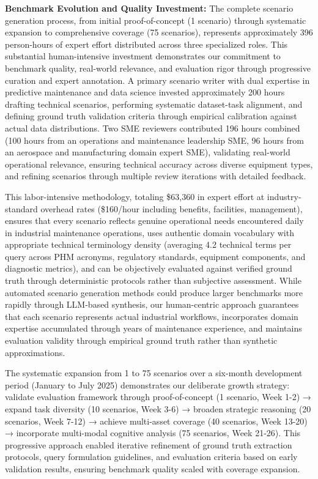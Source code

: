 \documentclass[sigconf,review]{acmart}
\begin{document}
\textbf{Benchmark Evolution and Quality Investment:} The complete scenario generation process, from initial proof-of-concept (1 scenario) through systematic expansion to comprehensive coverage (75 scenarios), represents approximately 396 person-hours of expert effort distributed across three specialized roles. This substantial human-intensive investment demonstrates our commitment to benchmark quality, real-world relevance, and evaluation rigor through progressive curation and expert annotation. A primary scenario writer with dual expertise in predictive maintenance and data science invested approximately 200 hours drafting technical scenarios, performing systematic dataset-task alignment, and defining ground truth validation criteria through empirical calibration against actual data distributions. Two SME reviewers contributed 196 hours combined (100 hours from an operations and maintenance leadership SME, 96 hours from an aerospace and manufacturing domain expert SME), validating real-world operational relevance, ensuring technical accuracy across diverse equipment types, and refining scenarios through multiple review iterations with detailed feedback.

This labor-intensive methodology, totaling \$63,360 in expert effort at industry-standard overhead rates (\$160/hour including benefits, facilities, management), ensures that every scenario reflects genuine operational needs encountered daily in industrial maintenance operations, uses authentic domain vocabulary with appropriate technical terminology density (averaging 4.2 technical terms per query across PHM acronyms, regulatory standards, equipment components, and diagnostic metrics), and can be objectively evaluated against verified ground truth through deterministic protocols rather than subjective assessment. While automated scenario generation methods could produce larger benchmarks more rapidly through LLM-based synthesis, our human-centric approach guarantees that each scenario represents actual industrial workflows, incorporates domain expertise accumulated through years of maintenance experience, and maintains evaluation validity through empirical ground truth rather than synthetic approximations.

The systematic expansion from 1 to 75 scenarios over a six-month development period (January to July 2025) demonstrates our deliberate growth strategy: validate evaluation framework through proof-of-concept (1 scenario, Week 1-2) → expand task diversity (10 scenarios, Week 3-6) → broaden strategic reasoning (20 scenarios, Week 7-12) → achieve multi-asset coverage (40 scenarios, Week 13-20) → incorporate multi-modal cognitive analysis (75 scenarios, Week 21-26). This progressive approach enabled iterative refinement of ground truth extraction protocols, query formulation guidelines, and evaluation criteria based on early validation results, ensuring benchmark quality scaled with coverage expansion.
\end{document}
